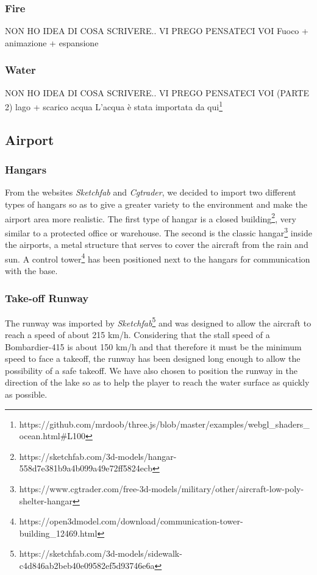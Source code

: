 \documentclass{article}
\begin{document}
\subsubsection*{Fire}
NON HO IDEA DI COSA SCRIVERE.. VI PREGO PENSATECI VOI
Fuoco + animazione + espansione

\subsubsection*{Water}
NON HO IDEA DI COSA SCRIVERE.. VI PREGO PENSATECI VOI (PARTE 2)
lago + scarico acqua
L'acqua è stata importata da qui\footnote{https://github.com/mrdoob/three.js/blob/master/examples/webgl\_shaders\_ocean.html\#L100}

\subsection*{Airport}

\subsubsection*{Hangars}
From the websites \textit{Sketchfab} and \textit{Cgtrader}, we decided to import two different types of hangars so as to give a greater variety to the environment and make the airport area more realistic. The first type of hangar is a closed building\footnote{https://sketchfab.com/3d-models/hangar-558d7e381b9a4b099a49e72ff5824ecb}, very similar to a protected office or warehouse.
The second is the classic hangar\footnote{https://www.cgtrader.com/free-3d-models/military/other/aircraft-low-poly-shelter-hangar} inside the airports, a metal structure that serves to cover the aircraft from the rain and sun. A control tower\footnote{https://open3dmodel.com/download/communication-tower-building\_12469.html} has been positioned next to the hangars for communication with the base.

\subsubsection*{Take-off Runway}
The runway was imported by \textit{Sketchfab}\footnote{https://sketchfab.com/3d-models/sidewalk-c4d846ab2beb40e09582ef5d93746e6a} and was designed to allow the aircraft to reach a speed of about 215 km/h. Considering that the stall speed of a Bombardier-415 is about 150 km/h and that therefore it must be the minimum speed to face a takeoff, the runway has been designed long enough to allow the possibility of a safe takeoff. We have also chosen to position the runway in the direction of the lake so as to help the player to reach the water surface as quickly as possible. 
\end{document}
